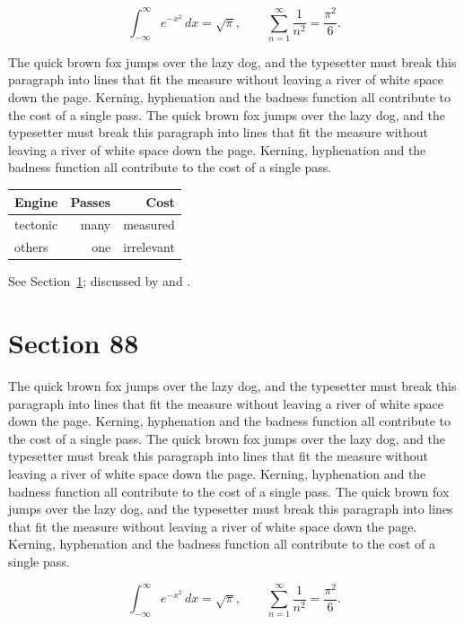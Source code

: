 \documentclass{article}
\begin{document}
\begin{equation}\label{eq:87}
\int_{-\infty}^{\infty} e^{-x^{2}}\,dx = \sqrt{\pi}, \qquad
\sum_{n=1}^{\infty} \frac{1}{n^{2}} = \frac{\pi^{2}}{6}.
\end{equation}

The quick brown fox jumps over the lazy dog, and the typesetter must break this paragraph into lines that fit the measure without leaving a river of white space down the page. Kerning, hyphenation and the badness function all contribute to the cost of a single pass. The quick brown fox jumps over the lazy dog, and the typesetter must break this paragraph into lines that fit the measure without leaving a river of white space down the page. Kerning, hyphenation and the badness function all contribute to the cost of a single pass. 

\begin{center}
\begin{tabular}{lrr}
\toprule
Engine & Passes & Cost \\
\midrule
tectonic & many & measured \\
others & one & irrelevant \\
\bottomrule
\end{tabular}
\end{center}

See Section~\ref{sec:88}; discussed by \textcite{k3} and \textcite{l5}.
\section{Section 88}
\label{sec:88}
The quick brown fox jumps over the lazy dog, and the typesetter must break this paragraph into lines that fit the measure without leaving a river of white space down the page. Kerning, hyphenation and the badness function all contribute to the cost of a single pass. The quick brown fox jumps over the lazy dog, and the typesetter must break this paragraph into lines that fit the measure without leaving a river of white space down the page. Kerning, hyphenation and the badness function all contribute to the cost of a single pass. The quick brown fox jumps over the lazy dog, and the typesetter must break this paragraph into lines that fit the measure without leaving a river of white space down the page. Kerning, hyphenation and the badness function all contribute to the cost of a single pass. 

\begin{equation}\label{eq:88}
\int_{-\infty}^{\infty} e^{-x^{2}}\,dx = \sqrt{\pi}, \qquad
\sum_{n=1}^{\infty} \frac{1}{n^{2}} = \frac{\pi^{2}}{6}.
\end{equation}
\end{document}
